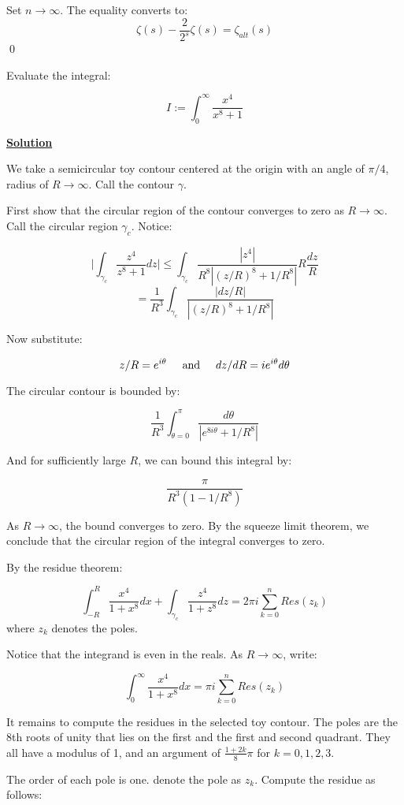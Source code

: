 \documentclass{article}
\newcommand{\new}[1]{
    \vspace{2mm}
    \noindent
    \textbf{
    \underline{#1}}
}
\newcommand{\textAnd}{
    {
        \hspace{5mm}
        \textrm{and}
        \hspace{5mm}
    }
}
\begin{document}
Set $n \rightarrow \infty$. The equality 
converts to:
\[
    \zeta(s)-\frac{2}{2^s}\zeta(s)= \zeta_{alt}(s)
\]
\qed 

\newpage
Evaluate the integral:

\[
    I := \int_0^\infty \frac{x^4}{x^8+1}
\]

\new{Solution}
We take a semicircular toy contour centered 
at the origin with an angle of $\pi/4$, 
radius of $R \rightarrow \infty$. 
Call the contour $\gamma$. 

First show that the circular region of 
the contour converges to zero as 
$R \rightarrow \infty$. Call 
the circular region $\gamma_c$. Notice:

\[
    \bigg|
        \int_{\gamma_c}
        \frac{z^4}{z^8+1} dz
    \bigg|
    \leq
    \int_{\gamma_c}
    \frac{|z^4|}{R^8|(z/R)^8+1/R^8|}R\frac{dz}{R}
\]
\[
    =\frac{1}{R^3}
    \int_{\gamma_c} \frac{|dz/R|}{|(z/R)^8+1/R^8|}
\]

Now substitute:

\[
    z/R = e^{i\theta}
    \textAnd 
    dz/dR = ie^{i\theta}d\theta
\]

The circular contour is bounded by:

\[
    \frac{1}{R^3}
    \int_{\theta = 0}^{\pi}
    \frac{d\theta}{|e^{8i\theta}+1/R^8|}
\]

And for sufficiently large $R$, we can bound 
this integral by:

\[
    \frac{\pi}{R^3(1-1/R^8)}
\]

As $R\rightarrow \infty$, the bound converges 
to zero. By the squeeze limit theorem, we conclude 
that the circular region of the integral converges to zero. 

By the residue theorem:

\[
    \int_{-R}^{R}\frac{x^4}{1+x^8}dx + \int_{\gamma_c}\frac{z^4}{1+z^8}dz = 2\pi i \sum_{k = 0}^n Res(z_k)
\]
where $z_k$ denotes the poles. 

Notice that the integrand is even 
in the reals. As $R\rightarrow \infty$, 
write:

\[
    \int_0^\infty \frac{x^4}{1+x^8}dx = \pi i \sum_{k = 0}^n Res(z_k)
\]

It remains to compute the residues in 
the selected toy contour. The poles 
are the 8th roots of unity that lies 
on the first and the first and 
second quadrant. They all have a 
modulus of 1, and an argument 
of $\frac{1+2k}{8}\pi$ for $k = 0, 1, 2, 3$. 

The order of each pole is one. denote the pole 
as $z_k$. Compute the residue as follows:
\end{document}
